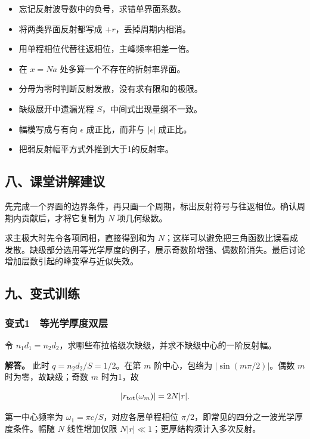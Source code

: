 \documentclass[12pt,a4paper,fontset=fandol]{ctexart}
\providecommand{\tightlist}{\setlength{\itemsep}{0pt}\setlength{\parskip}{0pt}}
\begin{document}
\begin{itemize}
\tightlist
\item
  忘记反射波导数中的负号，求错单界面系数。
\item
  将两类界面反射都写成 \(+r\)，丢掉周期内相消。
\item
  用单程相位代替往返相位，主峰频率相差一倍。
\item
  在 \(x=Na\) 处多算一个不存在的折射率界面。
\item
  分母为零时判断反射发散，没有求有限和的极限。
\item
  缺级展开中遗漏光程 \(S\)，中间式出现量纲不一致。
\item
  幅模写成与有向 \(\epsilon\) 成正比，而非与 \(|\epsilon|\) 成正比。
\item
  把弱反射幅平方式外推到大于1的反射率。
\end{itemize}

\subsection{八、课堂讲解建议}\label{ux516bux8bfeux5802ux8bb2ux89e3ux5efaux8bae-6}

先完成一个界面的边界条件，再只画一个周期，标出反射符号与往返相位。确认周期内贡献后，才将它复制为
\(N\) 项几何级数。

求主极大时先令各项同相，直接得到和为
\(N\)；这样可以避免把三角函数比误看成发散。缺级部分选用等光学厚度的例子，展示奇数阶增强、偶数阶消失。最后讨论增加层数引起的峰变窄与近似失效。

\subsection{九、变式训练}\label{ux4e5dux53d8ux5f0fux8badux7ec3-6}

\subsubsection{变式1　等光学厚度双层}\label{ux53d8ux5f0f1-ux7b49ux5149ux5b66ux539aux5ea6ux53ccux5c42}

令 \(n_1d_1=n_2d_2\)，求哪些布拉格级次缺级，并求不缺级中心的一阶反射幅。

\textbf{解答。} 此时 \(q=n_2d_2/S=1/2\)。在第 \(m\) 阶中心，包络为
\(|\sin(m\pi/2)|\)。偶数 \(m\) 时为零，故缺级；奇数 \(m\) 时为1，故

\[
|r_{\rm tot}(\omega_m)|=2N|r|.
\]

第一中心频率为 \(\omega_1=\pi c/S\)，对应各层单程相位
\(\pi/2\)，即常见的四分之一波光学厚度条件。幅随 \(N\) 线性增加仅限
\(N|r|\ll1\)；更厚结构须计入多次反射。
\end{document}
